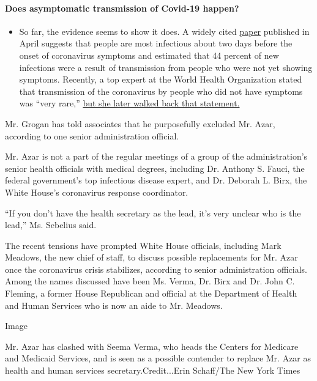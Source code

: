 \begin{itemize}
{  \paragraph{Does asymptomatic transmission of Covid-19
  happen?}\label{does-asymptomatic-transmission-of-covid-19-happen}}

  \begin{itemize}
  \tightlist
  \item
    So far, the evidence seems to show it does. A widely cited
    \href{https://www.nature.com/articles/s41591-020-0869-5}{paper}
    published in April suggests that people are most infectious about
    two days before the onset of coronavirus symptoms and estimated that
    44 percent of new infections were a result of transmission from
    people who were not yet showing symptoms. Recently, a top expert at
    the World Health Organization stated that transmission of the
    coronavirus by people who did not have symptoms was ``very rare,''
    \href{https://www.nytimes3xbfgragh.onion/2020/06/09/world/coronavirus-updates.html?action=click\&pgtype=Article\&state=default\&region=MAIN_CONTENT_3\&context=storylines_faq\#link-1f302e21}{but
    she later walked back that statement.}
  \end{itemize}
\end{itemize}

Mr. Grogan has told associates that he purposefully excluded Mr. Azar,
according to one senior administration official.

Mr. Azar is not a part of the regular meetings of a group of the
administration's senior health officials with medical degrees, including
Dr. Anthony S. Fauci, the federal government's top infectious disease
expert, and Dr. Deborah L. Birx, the White House's coronavirus response
coordinator.

``If you don't have the health secretary as the lead, it's very unclear
who is the lead,'' Ms. Sebelius said.

The recent tensions have prompted White House officials, including Mark
Meadows, the new chief of staff, to discuss possible replacements for
Mr. Azar once the coronavirus crisis stabilizes, according to senior
administration officials. Among the names discussed have been Ms. Verma,
Dr. Birx and Dr. John C. Fleming, a former House Republican and official
at the Department of Health and Human Services who is now an aide to Mr.
Meadows.

Image

Mr. Azar has clashed with Seema Verma, who heads the Centers for
Medicare and Medicaid Services, and is seen as a possible contender to
replace Mr. Azar as health and human services secretary.Credit...Erin
Schaff/The New York Times

